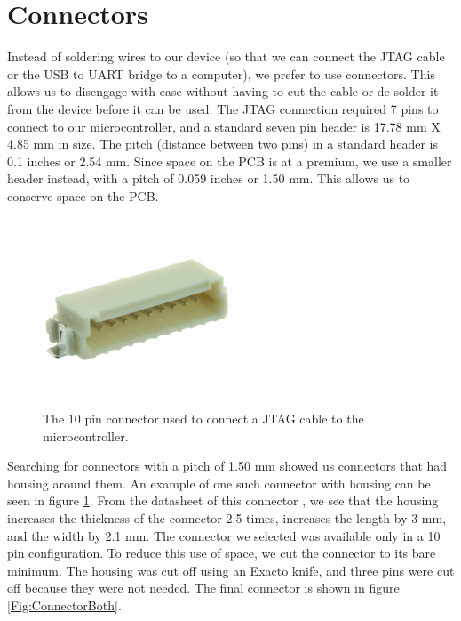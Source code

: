 \section{Connectors}
\label{Sec:Connectors}
Instead of soldering wires to our device (so that we can connect the JTAG cable or the USB to UART bridge to a computer), we prefer to use connectors. This allows us to disengage with ease without having to cut the cable or de-solder it from the device before it can be used. The JTAG connection required 7 pins to connect to our microcontroller, and a standard seven pin header is 17.78 mm X 4.85 mm in size. The pitch (distance between two pins) in a standard header is 0.1 inches or 2.54 mm. Since space on the PCB is at a premium, we use a smaller header instead, with a pitch of 0.059 inches or 1.50 mm. This allows us to conserve space on the PCB.
\begin{figure}
\begin{center}
\includegraphics[width=0.5\textwidth]{images/ConnectorWhole.JPG}
\caption{The 10 pin connector used to connect a JTAG cable to the microcontroller.}
\label{Fig:ConnectorWhole}
\end{center}
\end{figure}
Searching for connectors with a pitch of 1.50 mm showed us connectors that had housing around them.
An example of one such connector with housing can be seen in figure \ref{Fig:ConnectorWhole}.
From the datasheet of this connector \cite{Datasheet:TEConnHeader},
we see that the housing increases the thickness of the connector 2.5 times,
increases the length by 3 mm,
and the width by 2.1 mm. The connector we selected was available only in a 10 pin configuration.
To reduce this use of space, we cut the connector to its bare minimum.
The housing was cut off using an Exacto knife,
and three pins were cut off because they were not needed.
The final connector is shown in figure \ref{Fig:ConnectorBoth}.
